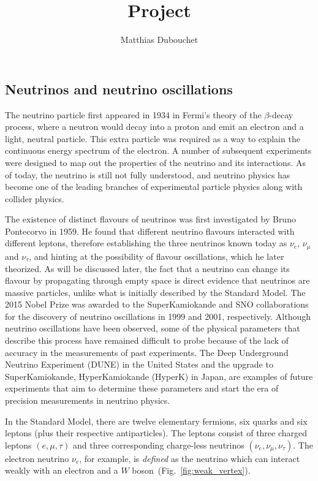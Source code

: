 \documentclass[10pt, a4paper]{article}
\title{Project}
\author{Matthias Dubouchet}
\date{}
\begin{document}
\maketitle


\subsection{Neutrinos and neutrino oscillations}
The neutrino particle first appeared in 1934 in Fermi's theory of the $\beta$-decay
process\cite{fermi}, where a neutron would decay into a proton and emit an electron and a
light, neutral particle. This extra particle was required as a way to explain the
continuous energy spectrum of the electron. A number of subsequent experiments
were designed to map out the properties of the neutrino and its
interactions\cite{zuber}. As of today, the neutrino is still not fully
understood, and neutrino physics has become one of the leading branches of
experimental particle physics along with collider physics. 

The existence of distinct flavours of neutrinos was first investigated by
Bruno Pontecorvo in 1959\cite{pontecorvo}. He found that different neutrino flavours
interacted with different leptons, therefore establishing the three neutrinos
known today as $\nu_e$, $\nu_\mu$ and $\nu_\tau$, and hinting at the
possibility of flavour oscillations, which he later theorized.
As will be discussed later, the fact that a neutrino can change its flavour by
propagating through empty space is direct evidence that neutrinos are massive
particles, unlike what is initially described by the Standard Model.
The 2015 Nobel Prize was awarded to the SuperKamiokande and SNO collaborations
for the discovery of neutrino oscillations in 1999 and 2001, respectively.
Although neutrino oscillations have been observed, some of the physical parameters that
describe this process have remained difficult to probe because of the lack of
accuracy in the measurements of past experiments. 
The Deep Underground Neutrino Experiment (DUNE) in the United States and the
upgrade to SuperKamiokande, HyperKamiokande (HyperK) in Japan, are examples of
future experiments that aim to determine these parameters and start the era of
precision measurements in neutrino physics.

In the Standard Model, there are twelve elementary fermions, six quarks and six
leptons (plus their respective antiparticles). The leptons consist of three
charged leptons $(e, \mu, \tau)$ and three corresponding charge-less neutrinos
$(\nu_e, \nu_\mu, \nu_\tau)$. The electron neutrino $\nu_e$, for example, is
\emph{defined} as the neutrino which can interact weakly with an electron and a
$W$ boson~(Fig.~\ref{fig:weak_vertex}).
\end{document}
